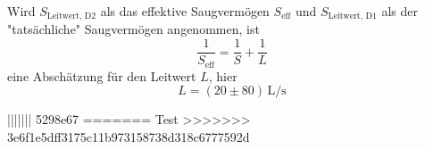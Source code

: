Wird $S_{\text{Leitwert, D2}}$ als das effektive Saugvermögen $S_\text{eff}$ und $S_{\text{Leitwert, D1}}$ als der "tatsächliche" Saugvermögen angenommen, ist 
\begin{equation}
    \frac{1}{S_\text{eff}} = \frac{1}{S} + \frac{1}{L}
\end{equation}
eine Abschätzung für den Leitwert $L$, hier
\begin{equation}
    L = (20 \pm 80) \, \si{\liter\per\second}
\end{equation}

||||||| 5298e67
=======
Test \cite{grundlagen_vakuumtechnik}
>>>>>>> 3e6f1e5dff3175c11b973158738d318c6777592d
